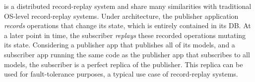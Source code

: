 \begin{table}[t]
 \caption{{\bf Similarities Between \scribe and \synapse.}
 Each row depicts the equivalent entity with \scribe and \synapse.}
 \label{synapse:tab:similarities}
\end{table}

\synapse is a distributed record-replay system and share many
similarities with traditional OS-level record-replay systems.
Under \synapse architecture, the publisher application {\em records} operations that
change its state, which is entirely contained in its DB.  At a later
point in time, the subscriber {\em replays} these recorded operations mutating
its state. Considering a publisher app that publishes all of its models, and a
subscriber app running the same code as the publisher app that subscribes to all
models, the subscriber is a perfect replica of the publisher. This replica
can be used for fault-tolerance purposes, a typical use case of record-replay systems.

